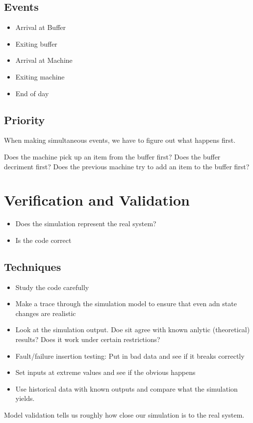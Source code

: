 \documentclass[fleqn]{report}
\begin{document}
\subsection{Events}
\begin{itemize}
    \item
    Arrival at Buffer
    \item 
    Exiting buffer 
    \item
    Arrival at Machine 
    \item 
    Exiting machine 
    \item 
    End of day 
\end{itemize}

\subsection{Priority}
When making simultaneous events, we have to figure out what happens first.

Does the machine pick up an item from the buffer first? Does the buffer 
decriment first? Does the previous machine try to add an item to 
the buffer first?

\section{Verification and Validation}
\begin{itemize}
    \item
    Does the simulation represent the real system?
    \item 
    Is the code correct 
\end{itemize}

\subsection{Techniques}
\begin{itemize}
    \item 
    Study the code carefully 
    \item 
    Make a trace through the simulation model to ensure 
    that even adn state changes are realistic 
    \item 
    Look at the simulation output. Doe sit 
    agree with known anlytic (theoretical) results?
    Does it work under certain restrictions?
    \item
    Fault/failure insertion testing:
    Put in bad data and see if it breaks correctly 
    \item 
    Set inputs at extreme values and see if the obvious happens 
    \item 
    Use historical data with known outputs and compare what the simulation yields.
\end{itemize}
\noindent 
Model validation tells us roughly how close our simulation is 
to the real system. 
\end{document}
